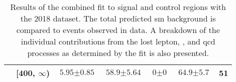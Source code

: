 \begin{table}[htbp]
\begin{tabular*}{\linewidth}{@{\extracolsep{\fill}}llccccr}
        & [400, $\infty$) &    $\text{5.95} \pm \text{0.85}$ &     $\text{58.9} \pm \text{5.64}$ &      $\text{0} \pm \text{0}$ &       $\text{64.9} \pm \text{5.7}$ &     51 \\
    \bottomrule
\end{tabular*}
\caption[Results of the combined fit to signal and control regions with the 2018 dataset]{Results of the combined fit to signal and control regions with the 2018 dataset. The total predicted \acrlong{sm} background is compared to events observed in data. A breakdown of the individual contributions from the lost lepton, \ztonunu, and \acrshort{qcd} processes as determined by the fit is also presented.}
\label{tab:yields_SR_B_only_2018}
\end{table}
